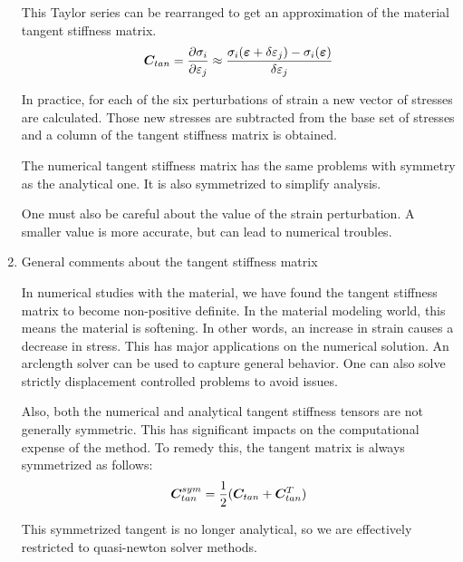 \documentclass[11pt]{article}
\begin{document}
\begin{enumerate}
This Taylor series can be rearranged to get an approximation of the
material tangent stiffness matrix.
\[
\bm{C}_{tan} = \frac{\partial \sigma_i}{\partial \varepsilon_j} \approx
\frac{\sigma_i (\bm{\varepsilon} + \delta \varepsilon_j) - \sigma_i (\bm{\varepsilon})}{\delta \varepsilon_j}
\]

In practice, for each of the six perturbations of strain a
new vector of stresses are calculated. Those new stresses are
subtracted from the base set of stresses and a column of the tangent
stiffness matrix is obtained.

The numerical tangent stiffness matrix has the same problems with
symmetry as the analytical one. It is also symmetrized to simplify
analysis.

One must also be careful about the value of the strain perturbation. A
smaller value is more accurate, but can lead to numerical troubles.
\item General comments about the tangent stiffness matrix
\label{sec:org36dc872}

In numerical studies with the material, we have found the tangent
stiffness matrix to become non-positive definite. In the material
modeling world, this means the material is softening. In other words,
an increase in strain causes a decrease in stress. This has major
applications on the numerical solution. An arclength solver can be
used to capture general behavior. One can also solve strictly
displacement controlled problems to avoid issues.

Also, both the numerical and analytical tangent stiffness tensors are
not generally symmetric. This has significant impacts on the
computational expense of the method. To remedy this, the tangent
matrix is always symmetrized as follows: 
\[
\bm{C}_{tan}^{sym} = \frac{1}{2} ( \bm{C}_{tan} + \bm{C}_{tan}^T )
\]

This symmetrized tangent is no longer analytical, so we are
effectively restricted to quasi-newton solver methods.
\end{enumerate}
\end{document}
